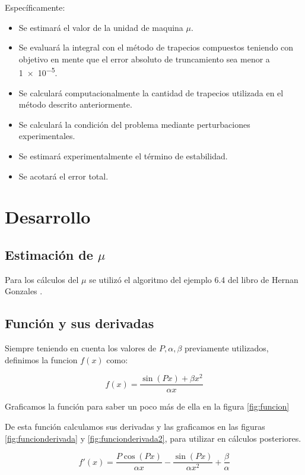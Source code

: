 \documentclass[11pt,a4paper]{article}
\begin{document}
Específicamente:

\begin{itemize}
\item Se estimará el valor de la unidad de maquina \( \mu \).
\item Se evaluará la integral con el método de trapecios compuestos teniendo con objetivo en mente que el error absoluto de truncamiento sea menor a \num{1e-5}.
\item Se calculará computacionalmente la cantidad de trapecios utilizada en el método descrito anteriormente.
\item Se calculará la condición del problema mediante perturbaciones experimentales.
\item Se estimará experimentalmente el término de estabilidad.
\item Se acotará el error total.
\end{itemize}

\section{Desarrollo}

\subsection{Estimación de \( \mu \) }

Para los cálculos del \( \mu \) se utilizó el algoritmo del ejemplo 6.4 del libro de Hernan Gonzales \cite{Gonzales}.

\subsection{Función y sus derivadas}

Siempre teniendo en cuenta los valores de \(P, \alpha, \beta \) previamente utilizados, definimos la funcion \( f(x) \) como:

\[ f(x) = \frac{\sin{(P x)}  + \beta x^2}{\alpha x} \]

Graficamos la función para saber un poco más de ella en la figura \ref{fig:funcion}



De esta función calculamos sus derivadas y las graficamos en las figuras \ref{fig:funcionderivada} y \ref{fig:funcionderivada2}, para utilizar en cálculos posteriores.

\[ f'(x) = \frac{P \cos{(P x)}}{\alpha x} - \frac{ \sin{(P x)}}{\alpha x^2} + \frac{\beta}{\alpha} \]
\end{document}
